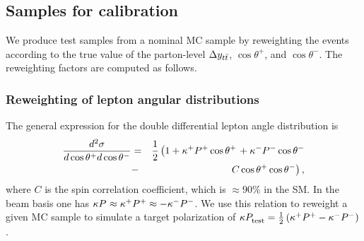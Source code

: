 \documentclass[aps,prd,twocolumn,showpacs,superscriptaddress,groupedaddress,floatfix]{revtex4}
\begin{document}
\subsection{Samples for calibration}
\label{subsec:rewFunction}





We produce test samples from a nominal MC sample
by reweighting the events according to  the true value of the parton-level $\Delta y_{t\bar{t}}$, $\cos\theta^+$, and  $\cos\theta^-$. The reweighting factors are computed as follows.


\subsubsection{Reweighting of lepton angular distributions}
\label{subsec:rewFunction_costheta}
The general expression for the  double differential lepton angle distribution
is~\cite{Bernreuther:2008ju}
\begin{eqnarray}
 \label{eq:two_lepton_polar}
\frac{{d}^2 \sigma}
{{d} \cos\theta^{+}{d} \cos\theta^{-}}&=&
\frac 1 2 \left( 
1+ \kappa^{+} P^{+}_{}\cos\theta^{+}\right. 
+ \kappa^{-} P^{-}_{} \cos\theta^{-}\nonumber \\  &-& \left.C\cos\theta^{+}\cos\theta^{-}
\right),
\end{eqnarray}
where $C$ is the spin correlation coefficient, which is $\approx 90\% $ in the SM.
In the beam basis one has $\kappa P^{}_{}\approx \kappa^{+} P^{+}_{} \approx -\kappa^{-} P^{-}_{}$. 
We use this relation
to reweight a given MC sample to simulate a target polarization of
 $\kappa P^{}_{\rm  test}= \frac 1 2 \left( \kappa^{+} P^{+}_{}{}-\kappa^{-} P^{-}_{}{}\right)$.
\end{document}
